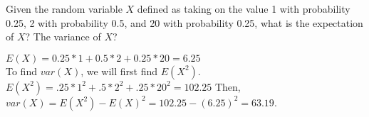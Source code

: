 \question Given the random variable $X$ defined as taking on the value 
1 with probability 0.25, 2 with probability 0.5, and 20 with probability 
0.25, what is the expectation of $X$? The variance of $X$?
\begin{solution}[2cm]
$E(X) = 0.25*1 + 0.5*2 + 0.25*20 = 6.25$ \\ 
To find $var(X)$, we will first find $E(X^2)$.
$E(X^2) = .25 * 1^2 + .5 * 2^2 + .25 * 20^2 = 102.25$
Then, $var(X) = E(X^2) - E(X)^2 = 102.25 - (6.25)^2 = 63.19$.
\end{solution}